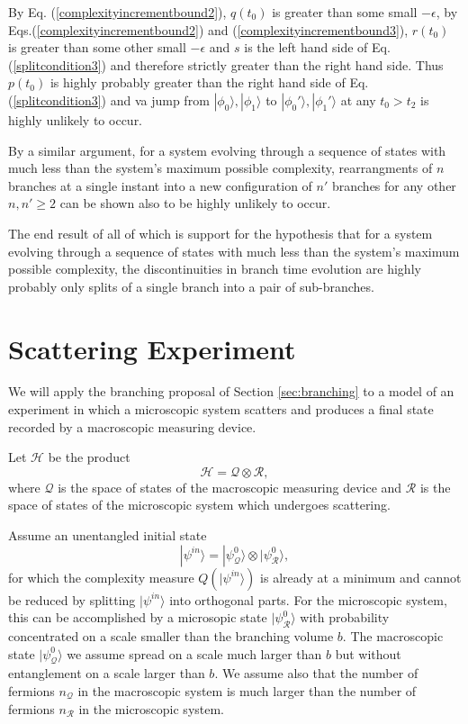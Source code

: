 \documentclass[twocolumn,amsmath,amssymb]{revtex4-1}
\begin{document}
By Eq. (\ref{complexityincrementbound2}), $q(t_0)$ is greater than some small $-\epsilon$,
by Eqs.(\ref{complexityincrementbound2}) and (\ref{complexityincrementbound3}), $r(t_0)$ is greater than
some other small $-\epsilon$ and 
$s$ is the left hand side of Eq. (\ref{splitcondition3}) and therefore strictly
greater than the right hand side. Thus $p(t_0)$ is highly probably greater
than the right hand side of Eq. (\ref{splitcondition3}) and
va jump from $|\phi_0 \rangle , |\phi_1 \rangle $ to
$|\phi_0' \rangle , |\phi_1' \rangle $ at any $t_0 > t_2$ is highly
unlikely to occur.

By a similar argument, for a system evolving through
a sequence of states with much less than the system's maximum
possible complexity,
rearrangments of $n$ branches
at a single instant into a new configuration of $n'$ branches
for any other $n, n' \ge 2$
can be shown also to be highly unlikely to occur.

The end result of all of which is
support for
the hypothesis that
for a system evolving
through a sequence of states
with much less
than the system's maximum possible complexity,
the discontinuities
in branch time evolution are
highly probably only splits of a single
branch into a pair of sub-branches.

\section{\label{sec:scattering} Scattering Experiment}

We will apply the branching proposal of Section \ref{sec:branching} to a
model of an experiment in which a microscopic system scatters and produces a final
state recorded by a macroscopic measuring device.

Let $\mathcal{H}$ be the product
\begin{equation}
\label{macromicro}
\mathcal{H} = \mathcal{Q} \otimes \mathcal{R},
\end{equation}
where $\mathcal{Q}$ is the space of states of the macroscopic measuring
device and $\mathcal{R}$ is the space of states of the microscopic
system which undergoes scattering.

Assume an unentangled initial state
\begin{equation}
\label{initialstate}
|\psi^{in} \rangle  = |\psi^0_{\mathcal{Q}} \rangle  \otimes |\psi^0_{\mathcal{R}} \rangle ,
\end{equation}
for which the complexity measure $Q( |\psi^{in} \rangle )$ is already at
a minimum and cannot be reduced by splitting $|\psi^{in} \rangle $ into
orthogonal parts. For the microscopic system, this
can be accomplished by a microsopic state $|\psi^0_{\mathcal{R}} \rangle $
with probability concentrated on a
scale smaller than the branching volume $b$. The macroscopic
state $|\psi^0_{\mathcal{Q}} \rangle $ we assume spread on a scale much
larger than $b$ but without entanglement on a scale larger than $b$.
We assume also that the number of fermions $n_{\mathcal{Q}}$ in
the macroscopic system is much larger than the number
of fermions $n_{\mathcal{R}}$ in the microscopic system.
\end{document}
